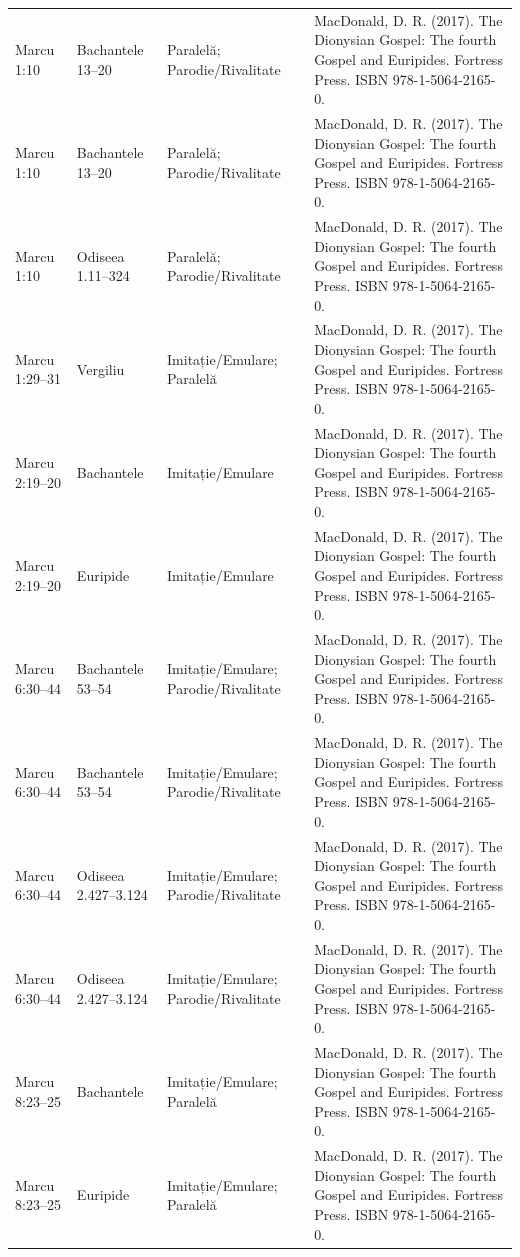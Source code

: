 \documentclass[12pt,a4paper,twoside,openany]{book}
\begin{document}
\begin{longtable}{L{1.4cm}L{1.7cm}L{3.1cm}L{8.4cm}}
Marcu 1:10 & Bachantele 13–20 & Paralelă; Parodie/Rivalitate & MacDonald, D. R. (2017). The Dionysian Gospel: The fourth Gospel and Euripides. Fortress Press. ISBN 978-1-5064-2165-0. \\
Marcu 1:10 & Bachantele 13–20 & Paralelă; Parodie/Rivalitate & MacDonald, D. R. (2017). The Dionysian Gospel: The fourth Gospel and Euripides. Fortress Press. ISBN 978-1-5064-2165-0. \\
Marcu 1:10 & Odiseea 1.11–324 & Paralelă; Parodie/Rivalitate & MacDonald, D. R. (2017). The Dionysian Gospel: The fourth Gospel and Euripides. Fortress Press. ISBN 978-1-5064-2165-0. \\
Marcu 1:29–31 & Vergiliu & Imitație/Emulare; Paralelă & MacDonald, D. R. (2017). The Dionysian Gospel: The fourth Gospel and Euripides. Fortress Press. ISBN 978-1-5064-2165-0. \\
Marcu 2:19–20 & Bachantele & Imitație/Emulare & MacDonald, D. R. (2017). The Dionysian Gospel: The fourth Gospel and Euripides. Fortress Press. ISBN 978-1-5064-2165-0. \\
Marcu 2:19–20 & Euripide & Imitație/Emulare & MacDonald, D. R. (2017). The Dionysian Gospel: The fourth Gospel and Euripides. Fortress Press. ISBN 978-1-5064-2165-0. \\
Marcu 6:30–44 & Bachantele 53–54 & Imitație/Emulare; Parodie/Rivalitate & MacDonald, D. R. (2017). The Dionysian Gospel: The fourth Gospel and Euripides. Fortress Press. ISBN 978-1-5064-2165-0. \\
Marcu 6:30–44 & Bachantele 53–54 & Imitație/Emulare; Parodie/Rivalitate & MacDonald, D. R. (2017). The Dionysian Gospel: The fourth Gospel and Euripides. Fortress Press. ISBN 978-1-5064-2165-0. \\
Marcu 6:30–44 & Odiseea 2.427–3.124 & Imitație/Emulare; Parodie/Rivalitate & MacDonald, D. R. (2017). The Dionysian Gospel: The fourth Gospel and Euripides. Fortress Press. ISBN 978-1-5064-2165-0. \\
Marcu 6:30–44 & Odiseea 2.427–3.124 & Imitație/Emulare; Parodie/Rivalitate & MacDonald, D. R. (2017). The Dionysian Gospel: The fourth Gospel and Euripides. Fortress Press. ISBN 978-1-5064-2165-0. \\
Marcu 8:23–25 & Bachantele & Imitație/Emulare; Paralelă & MacDonald, D. R. (2017). The Dionysian Gospel: The fourth Gospel and Euripides. Fortress Press. ISBN 978-1-5064-2165-0. \\
Marcu 8:23–25 & Euripide & Imitație/Emulare; Paralelă & MacDonald, D. R. (2017). The Dionysian Gospel: The fourth Gospel and Euripides. Fortress Press. ISBN 978-1-5064-2165-0. \\

\end{longtable}
\end{document}
